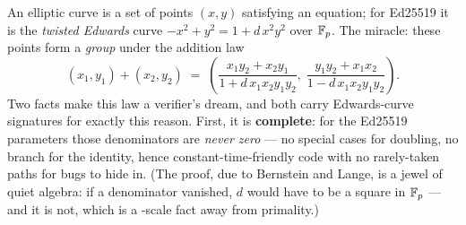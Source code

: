 An elliptic curve is a set of points $(x,y)$ satisfying an equation; for
Ed25519 it is the \emph{twisted Edwards} curve
$-x^2 + y^2 = 1 + d\,x^2 y^2$ over $\mathbb{F}_p$. The miracle: these points form a
\emph{group} under the addition law
\[
(x_1,y_1) + (x_2,y_2) \;=\;
\left(
\frac{x_1 y_2 + x_2 y_1}{1 + d\,x_1 x_2 y_1 y_2},\;
\frac{y_1 y_2 + x_1 x_2}{1 - d\,x_1 x_2 y_1 y_2}
\right).
\]
Two facts make this law a verifier's dream, and both carry Edwards-curve
signatures for exactly this reason. First, it is \textbf{complete}: for the
Ed25519 parameters those denominators are \emph{never zero} --- no special
cases for doubling, no branch for the identity, hence constant-time-friendly
code with no rarely-taken paths for bugs to hide in. (The proof, due to
Bernstein and Lange, is a jewel of quiet algebra: if a denominator vanished,
$d$ would have to be a square in $\mathbb{F}_p$ --- and it is not, which is a
-scale fact away from primality.)

